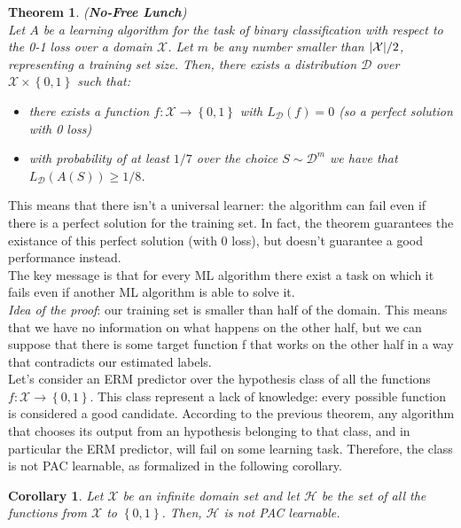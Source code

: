 \documentclass[12pt]{report}
\theoremstyle{plain}
\newtheorem{THEO}{Theorem}
\newtheorem{COR}{Corollary}
\newcommand\mcl[1]{\mathcal{#1}}
\begin{document}
\begin{flushleft}
\begin{THEO} (\textbf{No-Free Lunch})\\
	Let $A$ be a learning algorithm for the task of binary classification with respect to the 0-1 loss over a domain $\mcl{X}$. Let $m$ be any number smaller than $\abs{\mcl{X}}/2$, representing a training set size. Then, there exists a distribution $\mcl{D}$ over $\mcl{X}\times\left\{0,1\right\}$ such that:
	\begin{itemize}
		\item there exists a function $f:\mcl{X}\to\left\{0,1\right\}$ with $L_\mcl{D}(f)=0$ (so a perfect solution with 0 loss)
		\item with probability of at least $1/7$ over the choice $S\sim\mcl{D}^m$ we have that $L_\mcl{D}(A(S))\geq 1/8$.
	\end{itemize}
\end{THEO} 
This means that there isn't a universal learner: the algorithm can fail even if there is a perfect solution for the training set. In fact, the theorem guarantees the existance of this perfect solution (with 0 loss), but doesn't guarantee a good performance instead.\\
The key message is that for every ML algorithm there exist a task on which it fails even if another ML algorithm is able to solve it.\\

\vspace{0.3cm}
\textit{Idea of the proof}: our training set is smaller than half of the domain. This means that we have no information on what happens on the other half, but we can suppose that there is some target function f that works on the other half in a way that contradicts our estimated labels.\\

\vspace{0.5cm}
Let's consider an ERM predictor over the hypothesis class of all the functions $f:\mcl{X}\to\left\{0,1\right\}$. This class represent a lack of knowledge: every possible function is considered a good candidate. According to the previous theorem, any algorithm that chooses its output from an hypothesis belonging to that class, and in particular the ERM predictor, will fail on some learning task. Therefore, the class is not PAC learnable, as formalized in the following corollary.\\
\begin{COR}
	Let $\mcl{X}$ be an infinite domain set and let $\mcl{H}$ be the set of all the functions from $\mcl{X}$ to $\left\{0,1\right\}$. Then, $\mcl{H}$ is not PAC learnable.
\end{COR}


\end{flushleft}
\end{document}
